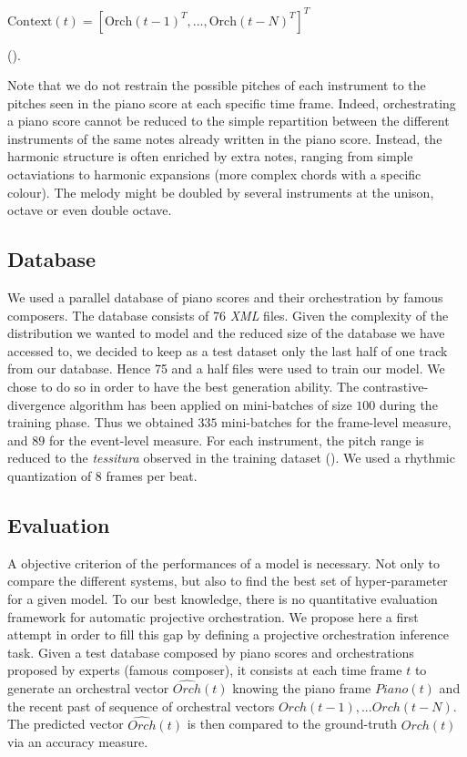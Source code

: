 \documentclass[letterpaper]{article}
\begin{document}
$\text{Context}(t) = \left[ \text{Orch}(t-1)^{T} , ... , \text{Orch}(t-N)^{T} \right]^{T}$ 

().

Note that we do not restrain the possible pitches of each instrument to the pitches seen in the piano score at each specific time frame. Indeed, orchestrating a piano score cannot be reduced to the simple repartition between the different instruments of the same notes already written in the piano score. Instead, the harmonic structure is often enriched by extra notes, ranging from simple octaviations to harmonic expansions (more complex chords with a specific colour). The melody might be doubled by several instruments at the unison, octave or even double octave.

\subsection{Database}
We used a parallel database of piano scores and their orchestration by famous composers. The database consists of 76 \textit{XML} files. Given the complexity of the distribution we wanted to model and the reduced size of the database we have accessed to, we decided to keep as a test dataset only the last half of one track from our database. Hence 75 and a half files were used to train our model. We chose to do so in order to have the best generation ability.
The contrastive-divergence algorithm has been applied on mini-batches of size $100$ during the training phase. Thus we obtained $335$ mini-batches for the frame-level measure, and $89$ for the event-level measure.
For each instrument, the pitch range is reduced to the \textit{tessitura} observed in the training dataset (). We used a rhythmic quantization of 8 frames per beat.

\subsection{Evaluation}
A objective criterion of the performances of a model is necessary. Not only to compare the different systems, but also to find the best set of hyper-parameter for a given model. To our best knowledge, there is no quantitative evaluation framework for automatic projective orchestration. We propose here a first attempt in order to fill this gap by defining a projective orchestration inference task. Given a test database composed by piano scores and orchestrations proposed by experts (famous composer), it consists at each time frame $t$ to generate an orchestral vector $\hat{Orch}(t)$ knowing the piano frame $Piano(t)$ and the recent past of sequence of orchestral vectors $Orch(t-1),... Orch(t-N)$. The predicted vector $\hat{Orch}(t)$ is then compared to the ground-truth $Orch(t)$ via an accuracy measure.
\end{document}
